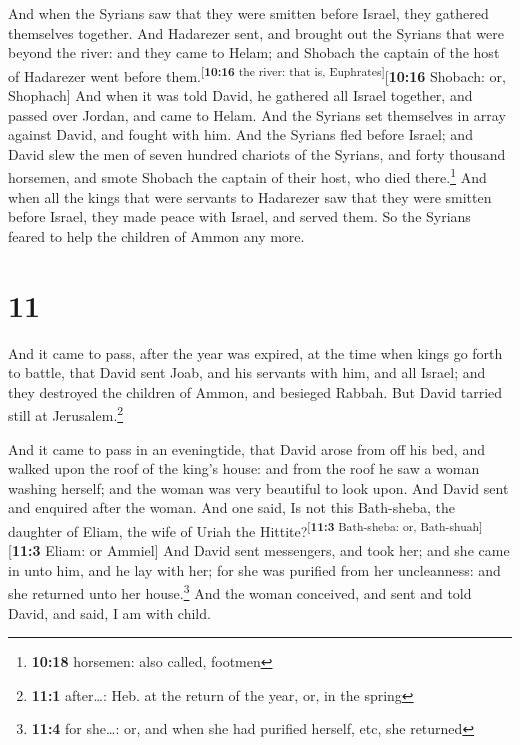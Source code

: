  And when the Syrians saw that they were smitten before
Israel, they gathered themselves together.  And Hadarezer
sent, and brought out the Syrians that were beyond the river: and they
came to Helam; and Shobach the captain of the host of Hadarezer went
before them.\textsuperscript{{[}\textbf{10:16} the river: that is,
Euphrates{]}}{[}\textbf{10:16} Shobach: or, Shophach{]} 
And when it was told David, he gathered all Israel together, and passed
over Jordan, and came to Helam. And the Syrians set themselves in array
against David, and fought with him.  And the Syrians fled
before Israel; and David slew the men of seven hundred chariots of the
Syrians, and forty thousand horsemen, and smote Shobach the captain of
their host, who died there.\footnote{\textbf{10:18} horsemen: also
  called, footmen}  And when all the kings that were
servants to Hadarezer saw that they were smitten before Israel, they
made peace with Israel, and served them. So the Syrians feared to help
the children of Ammon any more.

\hypertarget{section-10}{%
\section{11}\label{section-10}}

 And it came to pass, after the year was expired, at the
time when kings go forth to battle, that David sent Joab, and his
servants with him, and all Israel; and they destroyed the children of
Ammon, and besieged Rabbah. But David tarried still at
Jerusalem.\footnote{\textbf{11:1} after\ldots: Heb. at the return of the
  year, or, in the spring}

 And it came to pass in an eveningtide, that David arose
from off his bed, and walked upon the roof of the king's house: and from
the roof he saw a woman washing herself; and the woman was very
beautiful to look upon.  And David sent and enquired after
the woman. And one said, Is not this Bath-sheba, the daughter of Eliam,
the wife of Uriah the Hittite?\textsuperscript{{[}\textbf{11:3}
Bath-sheba: or, Bath-shuah{]}}{[}\textbf{11:3} Eliam: or Ammiel{]}
 And David sent messengers, and took her; and she came in
unto him, and he lay with her; for she was purified from her
uncleanness: and she returned unto her house.\footnote{\textbf{11:4} for
  she\ldots: or, and when she had purified herself, etc, she returned}
 And the woman conceived, and sent and told David, and
said, I am with child.

